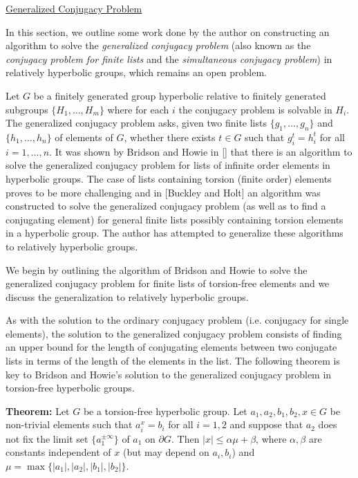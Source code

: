 \documentclass[12pt]{article}
\newcommand{\vs}{\vskip10pt}
\begin{document}
	\underline{Generalized Conjugacy Problem}

	\vs 
	
	In this section, we outline some work done by the author on constructing an algorithm to solve the \textit{generalized conjugacy problem} (also known as the \textit{conjugacy problem for finite lists} and the \textit{simultaneous conjugacy problem}) in relatively hyperbolic groups, which remains an open problem. 
	
	\vs 
	
	Let $G$ be a finitely generated group hyperbolic relative to finitely generated subgroups $\{H_1,...,H_m\}$ where for each $i$ the conjugacy problem is solvable in $H_i$. The generalized conjugacy problem asks, given two finite lists $\{g_1,...,g_n\}$ and $\{h_1,...,h_n\}$ of elements of $G$, whether there exists $t \in G$ such that $g_i^t = h_i^t$ for all $i = 1,...,n$. It was shown by Bridson and Howie in [] that there is an algorithm to solve the generalized conjugacy problem for lists of infinite order elements in hyperbolic groups. The case of lists containing torsion (finite order) elements proves to be more challenging and in [Buckley and Holt] an algorithm was constructed to solve the generalized conjugacy problem (as well as to find a conjugating element) for general finite lists possibly containing torsion elements in a hyperbolic group. The author has attempted to generalize these algorithms to relatively hyperbolic groups. 
	
	\vs 
	
	We begin by outlining the algorithm of Bridson and Howie to solve the generalized conjugacy problem for finite lists of torsion-free elements and we discuss the generalization to relatively hyperbolic groups. 
	
	\vs 
	
	As with the solution to the ordinary conjugacy problem (i.e. conjugacy for single elements), the solution to the generalized conjugacy problem consists of finding an upper bound for the length of conjugating elements between two conjugate lists in terms of the length of the elements in the list. The following theorem is key to Bridson and Howie's solution to the generalized conjugacy problem in torsion-free hyperbolic groups.
	
	\vs 
	
	\textbf{Theorem: } Let $G$ be a torsion-free hyperbolic group. Let $a_1, a_2, b_1, b_2, x \in G$ be non-trivial elements such that $a_i^x = b_i$ for all $i = 1,2$ and suppose that $a_2$ does not fix the limit set $\{a_1^{\pm \infty}\}$ of $a_1$ on $\partial G$. Then $\vert x \vert \leq \alpha \mu + \beta$, where $\alpha, \beta$ are constants independent of $x$ (but may depend on $a_i, b_i$) and $\mu = \max \{\vert a_1 \vert, \vert a_2 \vert, \vert b_1 \vert, \vert b_2 \vert \}$. 
	
\end{document}
